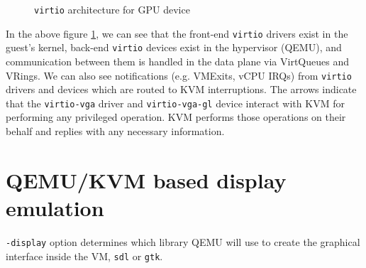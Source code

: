 \documentclass[a4paper,12pt, final]{report}
\begin{document}
\begin{figure}[H]
    \centering
    \caption{\texttt{virtio} architecture for GPU device}
    \label{fig:virtio_vgpu_qemu_flow}
\end{figure}

\noindent In the above figure \ref{fig:virtio_vgpu_qemu_flow}, we can see that the front-end \verb|virtio| drivers exist in the guest’s kernel, back-end \verb|virtio| devices exist in the hypervisor (QEMU), and communication between them is handled in the data plane via VirtQueues and VRings. We can also see notifications (e.g. VMExits, vCPU IRQs) from \verb|virtio| drivers and devices which are routed to KVM interruptions. The arrows indicate that the \verb|virtio-vga| driver and \verb|virtio-vga-gl| device interact with KVM for performing any privileged operation. KVM performs those operations on their behalf and replies with any necessary information.

\section{QEMU/KVM based display emulation}
\verb|-display| option determines which library QEMU will use to create the graphical interface inside the VM, \verb|sdl| or \verb|gtk|.
\end{document}
